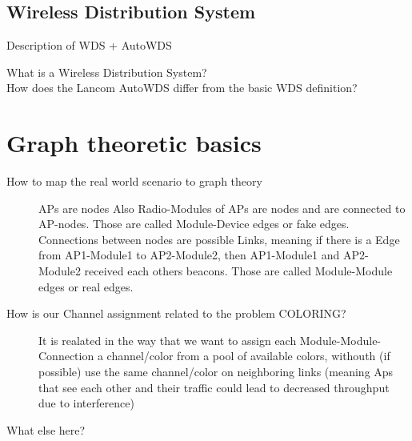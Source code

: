     \subsection{Wireless Distribution System}
    Description of WDS + AutoWDS \newline
      \begin{description}
       \item[What is a Wireless Distribution System?]
       \item[How does the Lancom AutoWDS differ from the basic WDS definition?]
      \end{description}
\section{Graph theoretic basics}
  \begin{description}
   \item[How to map the real world scenario to graph theory]
    APs are nodes \newline
    Also Radio-Modules of APs are nodes and are connected to AP-nodes. Those are called Module-Device edges or fake edges.\newline
    Connections between nodes are possible Links, meaning if there is a Edge from AP1-Module1 to AP2-Module2, then AP1-Module1 and AP2-Module2 received each others beacons. Those are called Module-Module edges or real edges. \newline
   \item[How is our Channel assignment related to the problem COLORING?]
    It is realated in the way that we want to assign each Module-Module-Connection a channel/color from a pool of available colors, withouth (if possible) use the same channel/color on neighboring links (meaning Aps that see each other and their traffic could lead to decreased throughput due to interference)
    \item[What else here?]
 \end{description}
